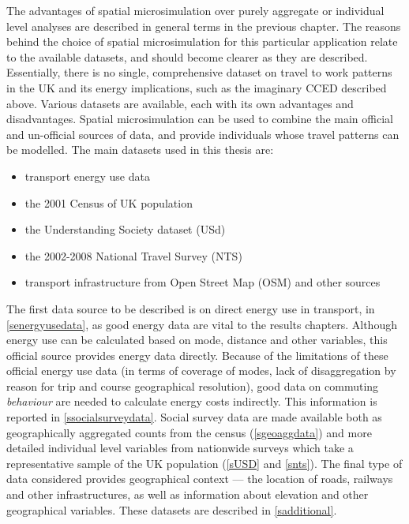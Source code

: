 \documentclass[a4paper, 11pt, twoside]{Thesis}
\begin{document}
The advantages of spatial microsimulation over purely aggregate or
individual level analyses are described in general terms in the previous
chapter. The reasons behind the choice of spatial
microsimulation for this particular application relate to the available
datasets, and should become clearer as they are described. Essentially, there is
no single, comprehensive dataset on travel to work patterns in the UK and its
energy implications, such as the imaginary CCED described above. Various
datasets are available, each with its own
advantages and disadvantages. Spatial microsimulation can be used to combine the
main
official and un-official sources of data, and provide individuals whose travel
patterns can be modelled. The main datasets used in this thesis are:
\begin{itemize}
 \item transport energy use data 
 \item the 2001 Census of UK population 
 \item the Understanding Society dataset (USd) 
 \item the 2002-2008 National Travel Survey (NTS) 
 \item transport infrastructure from Open Street Map (OSM) and
other sources 
\end{itemize}
The first data source to be described is on direct energy use in transport,
in \cref{senergyusedata}, as good energy data are vital to
the results chapters. Although energy use can be calculated based on
mode, distance and other variables, this official source provides energy
data directly. Because of the limitations of these official energy use data
(in terms of coverage of modes, lack of disaggregation by reason for trip
and course geographical resolution), good data on commuting
\emph{behaviour} are needed to calculate energy costs indirectly.
This information is reported in \cref{ssocialsurveydata}.
Social survey data are made available both as geographically aggregated
counts from the census (\cref{sgeoaggdata}) and more detailed individual level
variables from  nationwide surveys which take a representative sample of
the UK population (\cref{sUSD} and \cref{snts}). The final type of data
considered
provides geographical context --- the location of roads, railways and other
infrastructures, as well as information about elevation and other
geographical variables. These datasets are described in \cref{sadditional}.
\end{document}
